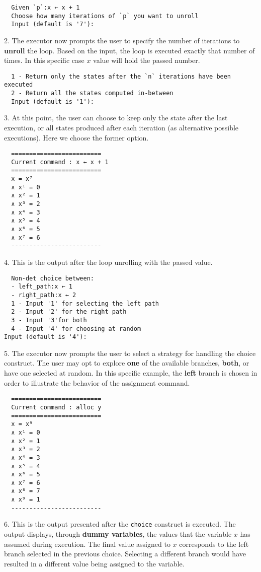 \documentclass[parskip=half]{scrartcl}
\begin{document}
\begin{verbatim}
  Given `p`:x ← x + 1
  Choose how many iterations of `p` you want to unroll
  Input (default is '7'): 
\end{verbatim}
2. The executor now prompts the user to specify the number of iterations to \textbf{unroll} the loop. Based on the input, the loop is executed exactly that number of times. In this specific case $x$ value will hold the passed number.

\begin{verbatim}
  1 - Return only the states after the `n` iterations have been executed
  2 - Return all the states computed in-between
  Input (default is '1'):
\end{verbatim}
3. At this point, the user can choose to keep only the state after the last execution, or all states produced after each iteration (as alternative possible executions). Here we choose the former option.

\begin{verbatim}
  =========================
  Current command : x ← x + 1
  =========================
  x = x⁷
  ∧ x¹ = 0
  ∧ x² = 1
  ∧ x³ = 2
  ∧ x⁴ = 3
  ∧ x⁵ = 4
  ∧ x⁶ = 5
  ∧ x⁷ = 6
  -------------------------
\end{verbatim}
4. This is the output after the loop unrolling with the passed value. 

\begin{verbatim}
  Non-det choice between:
  - left_path:x ← 1
  - right_path:x ← 2
  1 - Input '1' for selecting the left path
  2 - Input '2' for the right path
  3 - Input '3'for both
  4 - Input '4' for choosing at random
Input (default is '4'):
\end{verbatim}
5. The executor now prompts the user to select a strategy for handling the choice construct. The user may opt to explore \textbf{one} of the available branches, \textbf{both}, or have one selected at random. In this specific example, the \textbf{left} branch is chosen in order to illustrate the behavior of the assignment command.

\begin{verbatim}
  =========================
  Current command : alloc y
  =========================
  x = x⁹
  ∧ x¹ = 0
  ∧ x² = 1
  ∧ x³ = 2
  ∧ x⁴ = 3
  ∧ x⁵ = 4
  ∧ x⁶ = 5
  ∧ x⁷ = 6
  ∧ x⁸ = 7
  ∧ x⁹ = 1
  -------------------------
\end{verbatim}
6. This is the output presented after the \texttt{choice} construct is executed. The output displays, through \textbf{dummy variables}, the values that the variable $x$ has assumed during execution. The final value assigned to $x$ corresponds to the left branch selected in the previous choice. Selecting a different branch would have resulted in a different value being assigned to the variable.
\end{document}
